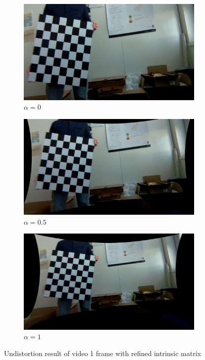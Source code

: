 \begin{figure}[h]
    \centering
    \begin{subfigure}[b]{0.3\textwidth}
        \centering
        \includegraphics[width=\textwidth]{figures/img1_2.jpg}
        \caption{$\alpha = 0$}
        \label{fig:dist2a}
    \end{subfigure}
    \hfill
    \begin{subfigure}[b]{0.3\textwidth}
        \centering
        \includegraphics[width=\textwidth]{figures/img1_3.jpg}
        \caption{$\alpha = 0.5$}
    \end{subfigure}
    \hfill
    \begin{subfigure}[b]{0.3\textwidth}
        \centering
        \includegraphics[width=\textwidth]{figures/img1_4.jpg}
        \caption{$\alpha = 1$}
    \end{subfigure}
    \caption{Undistortion result of video 1 frame with refined intrinsic matrix}
    \label{fig:dist2}
\end{figure}

